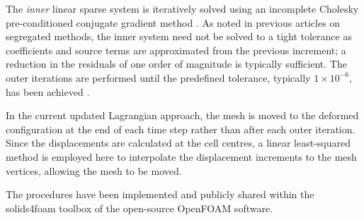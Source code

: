 \documentclass[sn-mathphys,Numbered]{sn-jnl}%
\begin{document}
The \emph{inner} linear sparse system is iteratively solved using an incomplete Cholesky pre-conditioned conjugate gradient method \cite{jacobs_generalization_1986}.
As noted in previous articles on segregated methods, the inner system need not be solved to a tight tolerance as coefficients and source terms are approximated from the previous increment; a reduction in the residuals of one order of magnitude is typically sufficient. The outer iterations are performed until the predefined tolerance, typically $1 \times 10^{-6}$, has been achieved \cite{cardiff_lagrangian_2017}. 

In the current updated Lagrangian approach, the mesh is moved to the deformed configuration at the end of each time step rather than after each outer iteration.
Since the displacements are calculated at the cell centres, a linear least-squared method is employed here \cite{cardiff_lagrangian_2017} to interpolate the displacement increments to the mesh vertices, allowing the mesh to be moved.

The procedures have been implemented and publicly shared within the solids4foam toolbox \citep{Cardiff2018, Tukovic2018} of the open-source OpenFOAM software.
\end{document}
